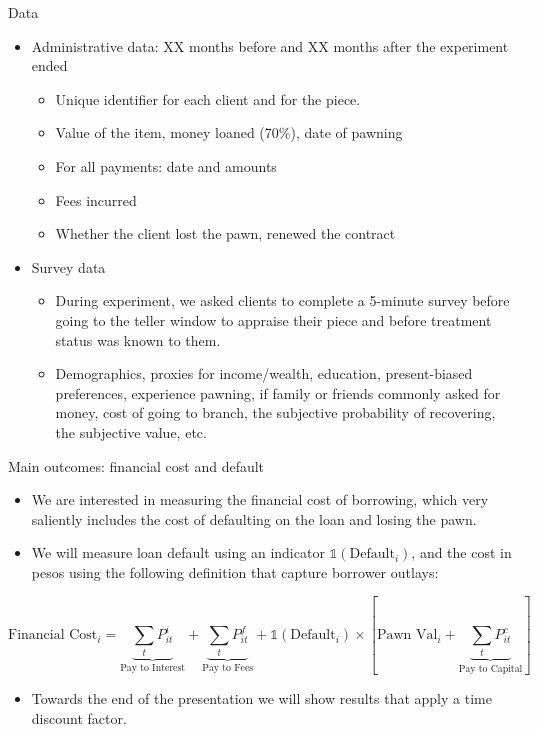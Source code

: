 \documentclass[8pt]{beamer}
\begin{document}
\begin{frame}{Data}
\begin{itemize}
    \item Administrative data: XX months before and XX months after the experiment ended
    \begin{itemize}
        \item Unique identifier for each client and for the piece.
        \item Value of the item, money loaned (70\%), date of pawning
        \item For all payments: date and amounts
        \item Fees incurred
        \item Whether the client lost the pawn, renewed the contract
    \end{itemize} 

    \vfill \item Survey data
    \begin{itemize}
        \item During experiment, we asked clients to complete a 5-minute survey before going to the teller window to appraise their piece and before treatment status was known to them.
        \item Demographics, proxies for income/wealth, education, present-biased preferences, experience pawning, if family or friends commonly asked for money, cost of going to branch, the subjective probability of recovering, the subjective value, etc.
    \end{itemize}
\end{itemize}    
\end{frame}


\begin{frame}{Main outcomes: financial cost and default}

\begin{itemize}
    \item We are interested in measuring the financial cost of borrowing, which very saliently includes the cost of defaulting on the loan and losing the pawn.
    \item We will measure loan default using an indicator $\mathds{1}(\text{Default}_i)$, and the cost in pesos using the following definition that capture borrower outlays:
\end{itemize}

   \begin{equation*}
    \text{Financial Cost}_i =  \underbrace{\sum_t P^i_{it}}_{\text{Pay to Interest}} + \underbrace{\sum_t P^f_{it}}_{\text{Pay to Fees}}  + \mathds{1}(\text{Default}_i) \times \left[\text{Pawn Val}_i + \underbrace{\sum_t P^c_{it}}_{\text{Pay to Capital}} \right]
   \end{equation*}

\begin{itemize}
    \vfill \item Towards the end of the presentation we will show results that apply a time discount factor.

\end{itemize}
\end{frame}
\end{document}
